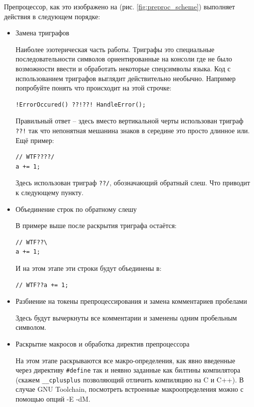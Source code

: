 \documentclass[a4paper,12pt,oneside]{article}
\begin{document}
Препроцессор, как это изображено на (рис. \ref{fig:preproc_scheme}) выполняет действия в следующем порядке:

\begin{itemize}
\item Замена триграфов 

Наиболее эзотерическая часть работы. Триграфы это специальные последовательности символов ориентированные на консоли где не было возможности ввести и обработать некоторые спецсимволы языка. Код с использованием триграфов выглядит действительно необычно. Например попробуйте понять что происходит на этой строчке: 

\begin{lstlisting}
!ErrorOccured() ??!??! HandleError();
\end{lstlisting}

Правильный ответ -- здесь вместо вертикальной черты использован триграф \lstinline$??!$ так что непонятная мешанина знаков в середине это просто длинное или. Ещё пример: 

\begin{lstlisting}
// WTF????/
a += 1;
\end{lstlisting}

Здесь использован триграф \lstinline$??/$, обозначающий обратный слеш. Что приводит к следующему пункту.

\item Объединение строк по обратному слешу

В примере выше после раскрытия триграфа остаётся:
\begin{lstlisting}
// WTF??\
a += 1;
\end{lstlisting}
И на этом этапе эти строки будут объединены в:
\begin{lstlisting}
// WTF??a += 1;
\end{lstlisting}

\item Разбиение на токены препроцессирования и замена комментариев пробелами

Здесь будут вычеркнуты все комментарии и заменены одним пробельным символом.

\item Раскрытие макросов и обработка директив препроцессора

На этом этапе раскрываются все макро-определения, как явно введенные через директиву \lstinline!#define! так и неявно заданные как билтины компилятора (скажем \lstinline!__cplusplus! позволяющий отличить компиляцию на C и C++). В случае GNU Toolchain, посмотреть встроенные макроопределения можно с помощью опций -E -dM.


\end{itemize}
\end{document}
